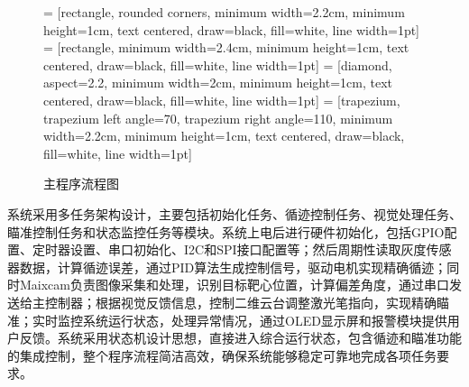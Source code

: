 \documentclass[12pt,a4paper]{ctexart}
\begin{document}
\begin{figure}
    \vspace{-15pt}
    \centering
     = [rectangle, rounded corners, minimum width=2.2cm, minimum height=1cm, text centered, draw=black, fill=white, line width=1pt]
     = [rectangle, minimum width=2.4cm, minimum height=1cm, text centered, draw=black, fill=white, line width=1pt]
     = [diamond, aspect=2.2, minimum width=2cm, minimum height=1cm, text centered, draw=black, fill=white, line width=1pt]
     = [trapezium, trapezium left angle=70, trapezium right angle=110, minimum width=2.2cm, minimum height=1cm, text centered, draw=black, fill=white, line width=1pt]
    
    \caption{主程序流程图}
    \label{fig:program_flowchart}
    \vspace{-5pt}
\end{figure}

系统采用多任务架构设计，主要包括初始化任务、循迹控制任务、视觉处理任务、瞄准控制任务和状态监控任务等模块。系统上电后进行硬件初始化，包括GPIO配置、定时器设置、串口初始化、I2C和SPI接口配置等；然后周期性读取灰度传感器数据，计算循迹误差，通过PID算法生成控制信号，驱动电机实现精确循迹；同时Maixcam负责图像采集和处理，识别目标靶心位置，计算偏差角度，通过串口发送给主控制器；根据视觉反馈信息，控制二维云台调整激光笔指向，实现精确瞄准；实时监控系统运行状态，处理异常情况，通过OLED显示屏和报警模块提供用户反馈。系统采用状态机设计思想，直接进入综合运行状态，包含循迹和瞄准功能的集成控制，整个程序流程简洁高效，确保系统能够稳定可靠地完成各项任务要求。
\end{document}
